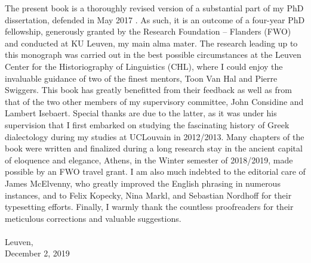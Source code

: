 \addchap{\lsAcknowledgementTitle} 
 
The present book is a thoroughly revised version of a substantial part of my PhD dissertation, defended in May 2017 \parencite{VanRooy2017}. As such, it is an outcome of a four-year PhD fellowship, generously granted by the Research Foundation – Flanders (FWO) and conducted at KU Leuven, my main alma mater. The research leading up to this monograph was carried out in the best possible circumstances at the Leuven Center for the Historiography of Linguistics (CHL), where I could enjoy the invaluable guidance of two of the finest mentors, Toon Van Hal and Pierre Swiggers. This book has greatly benefitted from their feedback as well as from that of the two other members of my supervisory committee, John Considine and Lambert Isebaert. Special thanks are due to the latter, as it was under his supervision that I first embarked on studying the fascinating history of Greek dialectology during my studies at UCLouvain in 2012/2013. Many chapters of the book were written and finalized during a long research stay in the ancient capital of eloquence and elegance, Athens, in the Winter semester of 2018/2019, made possible by an FWO travel grant. I am also much indebted to the editorial care of James McElvenny, who greatly improved the English phrasing in numerous instances, and to Felix Kopecky, Nina Markl, and Sebastian Nordhoff for their typesetting efforts. Finally, I warmly thank the countless proofreaders for their meticulous corrections and valuable suggestions.\\\\
Leuven,\\December 2, 2019
